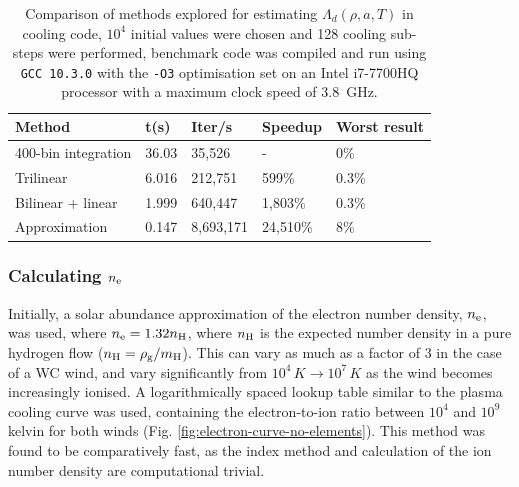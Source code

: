 \begin{table}[ht]
  \centering
  \begin{tabular}{lllll}
    \hline
    Method & t(s) & Iter/s & Speedup & Worst result \\ \hline
    400-bin integration & 36.03 & 35,526 & - & 0\% \\
    Trilinear & 6.016 & 212,751 & 599\% & 0.3\% \\
    Bilinear + linear & 1.999 & 640,447 & 1,803\% & 0.3\% \\
    Approximation & 0.147 & 8,693,171 & 24,510\% & 8\% \\ \hline
  \end{tabular}
  \caption[Dust cooling calculation comparison]{Comparison of methods explored for estimating $\Lambda_d(\rho,a,T)$ in cooling code, $10^4$ initial values were chosen and 128 cooling sub-steps were performed, benchmark code was compiled and run using \texttt{GCC 10.3.0} with the \texttt{-O3} optimisation set on an Intel i7-7700HQ processor with a maximum clock speed of \SI{3.8}{\giga\hertz}.}
  \label{tab:electron-speedup}
\end{table}

\subsubsection{Calculating $n_\text{e}$}

Initially, a solar abundance approximation of the electron number density, $n_\text{e}$, was used, where $n_\text{e} = 1.32 n_\text{H}$, where $n_\text{H}$ is the expected number density in a pure hydrogen flow ($n_\text{H} = \rho_\text{g} / m_\text{H}$).
This can vary as much as a factor of 3 in the case of a WC wind, and vary significantly from $10^4 \, \si{K} \rightarrow 10^7 \, \si{K}$ as the wind becomes increasingly ionised.
A logarithmically spaced lookup table similar to the plasma cooling curve was used, containing the electron-to-ion ratio between $10^4$ and $10^9$ kelvin for both winds (Fig. \ref{fig:electron-curve-no-elements}). 
This method was found to be comparatively fast, as the index method and calculation of the ion number density are computational trivial.

